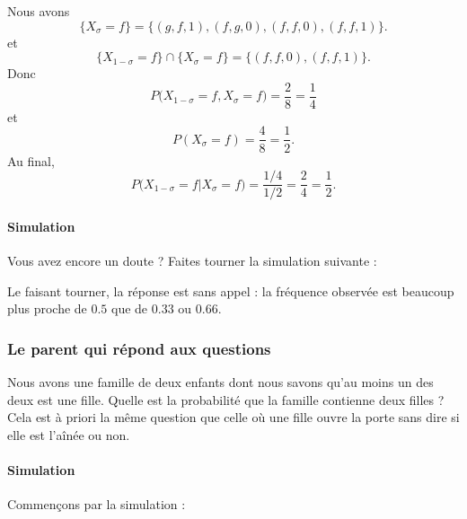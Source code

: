 Nous avons
\begin{equation}
	\{ X_{\sigma}=f \}=\{ (g,f,1),(f,g,0),(f,f,0),(f,f,1) \}.
\end{equation}
et
\begin{equation}
	\{ X_{1-\sigma}=f \}\cap\{ X_{\sigma}=f \}=\{ (f,f,0),(f,f,1) \}.
\end{equation}
Donc
\begin{equation}
	P\big( X_{1-\sigma}=f,X_{\sigma}=f \big)=\frac{ 2 }{ 8 }=\frac{1}{ 4 }
\end{equation}
et
\begin{equation}
	P(X_{\sigma}=f)=\frac{ 4 }{ 8 }=\frac{ 1 }{2}.
\end{equation}
Au final,
\begin{equation}
	P\big( X_{1-\sigma}=f|X_{\sigma}=f \big)=\frac{ 1/4 }{ 1/2 }=\frac{ 2 }{ 4 }=\frac{ 1 }{2}.
\end{equation}

\paragraph{Simulation}

Vous avez encore un doute ? Faites tourner la simulation suivante :


Le faisant tourner, la réponse est sans appel : la fréquence observée est beaucoup plus proche de \( 0.5\) que de \( 0.33\) ou \( 0.66\).

\subsubsection{Le parent qui répond aux questions}

Nous avons une famille de deux enfants dont nous savons qu'au moins un des deux est une fille. Quelle est la probabilité que la famille contienne deux filles ? Cela est à priori la même question que celle où une fille ouvre la porte sans dire si elle est l'aînée ou non.

\paragraph{Simulation}

Commençons par la simulation :

